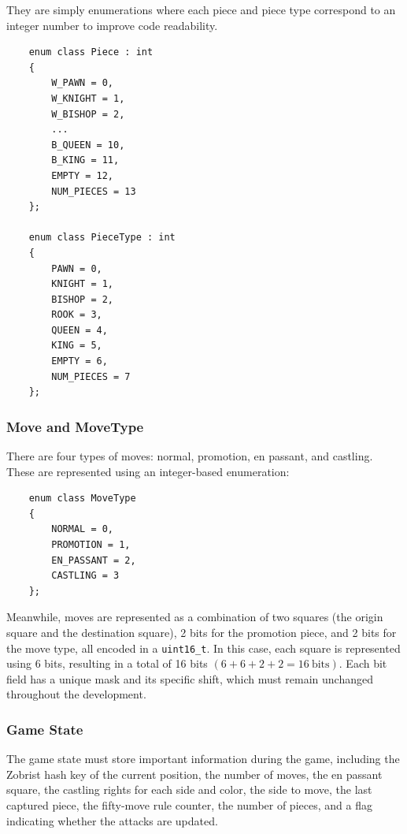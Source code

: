 They are simply enumerations where each piece and piece type correspond to an integer number to improve code readability.

\begin{lstlisting}
    enum class Piece : int
    {
        W_PAWN = 0,
        W_KNIGHT = 1,
        W_BISHOP = 2,
        ...
        B_QUEEN = 10,
        B_KING = 11,
        EMPTY = 12,
        NUM_PIECES = 13
    };

    enum class PieceType : int
    {
        PAWN = 0,
        KNIGHT = 1,
        BISHOP = 2,
        ROOK = 3,
        QUEEN = 4,
        KING = 5,
        EMPTY = 6,
        NUM_PIECES = 7
    };
\end{lstlisting}

\subsubsection{Move and MoveType}

There are four types of moves: normal, promotion, en passant, and castling. These are represented using an integer-based enumeration:

\begin{lstlisting}
    enum class MoveType
    {
        NORMAL = 0,
        PROMOTION = 1,
        EN_PASSANT = 2,
        CASTLING = 3
    };
\end{lstlisting}

\noindent Meanwhile, moves are represented as a combination of two squares (the origin square and the destination square), 2 bits for the promotion piece, and 2 bits for the move type, all encoded in a \texttt{uint16\_t}. In this case, each square is represented using 6 bits, resulting in a total of 16 bits $(6 + 6 + 2 + 2 = 16~\mathrm{bits})$. Each bit field has a unique mask and its specific shift, which must remain unchanged throughout the development.

\subsubsection{Game State}

The game state must store important information during the game, including the Zobrist hash key of the current position, the number of moves, the en passant square, the castling rights for each side and color, the side to move, the last captured piece, the fifty-move rule counter, the number of pieces, and a flag indicating whether the attacks are updated.

\vspace{1em}

